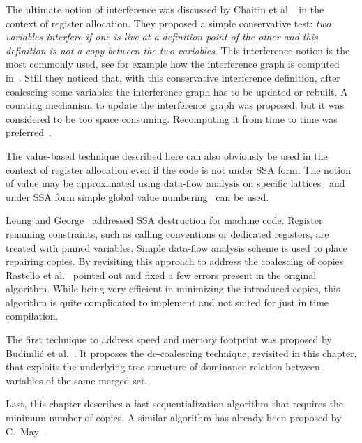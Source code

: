 The ultimate notion of interference was discussed by Chaitin et al.~\cite{Chaitin81} in the context of register allocation. 
They proposed a simple conservative test: 
\emph{two variables interfere if one is live at a definition point of the other and this definition is not a copy between the two variables}. 
This interference notion is the most commonly used, see for example how the interference graph is computed in~\cite{appel:2002:modern}. 
Still they noticed that, with this conservative interference definition, after coalescing some variables the interference graph has to be updated or rebuilt. 
A counting mechanism to update the interference graph was proposed, but it was considered to be too space consuming. 
Recomputing it from time to time was preferred~\cite{Chaitin81,Chaitin82}.

The value-based technique described here can also obviously be used in the context of register allocation even if the code is not under SSA form. 
The notion of value may be approximated using data-flow analysis on specific lattices~\cite{AlpernWZ88} and under SSA form simple global value numbering~\cite{Rosen88} can be used.

Leung and George~\cite{leung:1999:ssa_mach} addressed SSA destruction for machine code. 
Register renaming constraints, such as calling conventions or dedicated registers, are treated with pinned variables. 
Simple data-flow analysis scheme is used to place repairing copies. 
By revisiting this approach to address the coalescing of copies Rastello et al.~\cite{Rastello:2004:CGO} pointed out and fixed a few errors present in the original algorithm. 
While being very efficient in minimizing the introduced copies, this algorithm is quite complicated to implement and not suited for just in time compilation.

The first technique to address speed and memory footprint was proposed by Budimli\'{c} et al.~\cite{Budimlic02}. 
It proposes the de-coalescing technique, revisited in this chapter, that exploits the underlying tree structure of dominance relation between variables of the same merged-set.

Last, this chapter describes a fast sequentialization algorithm that requires the minimum number of copies. 
A similar algorithm has already been proposed by C.~May~\cite{May89}.





